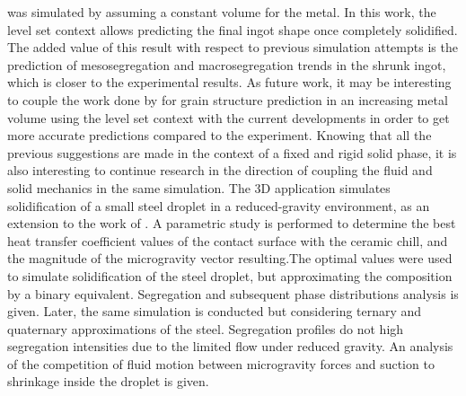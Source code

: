 was simulated by \citet{carozzani_direct_2013} assuming a constant volume for the metal. In this work, the level set context allows predicting
the final ingot shape once completely solidified. The added value of this result with respect to previous
simulation attempts is the prediction of mesosegregation and macrosegregation trends in the shrunk ingot, which is closer to the experimental results.
As future work, it may be interesting to couple the work done by \citet{chen_3d_2014} for grain structure prediction
in an increasing metal volume using the level set context with the current developments in order to get more
accurate predictions compared to the experiment. Knowing that all the previous suggestions are made in the context
of a fixed and rigid solid phase, it is also interesting to continue research in the direction of coupling the
fluid and solid mechanics in the same simulation.
\newline
\newline
The 3D application simulates solidification of a small steel droplet in a reduced-gravity environment, as
an extension to the work of \citet{rivaux_simulation_2011}. A parametric study is performed to determine
the best heat transfer coefficient values of the contact surface with the ceramic chill, and the magnitude of the microgravity vector
resulting.The optimal values were used to simulate solidification of the steel droplet, but approximating the composition by a binary equivalent.
Segregation and subsequent phase distributions analysis is given. Later, the same simulation is conducted but considering
ternary and quaternary approximations of the steel. Segregation profiles do not high segregation intensities due to the limited flow under
reduced gravity. An analysis of the competition of fluid motion between microgravity forces and suction to shrinkage inside the droplet is given.   







